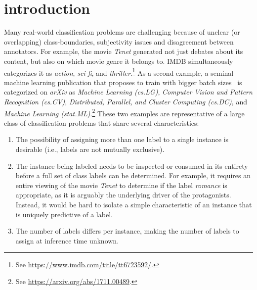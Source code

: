 
\section{introduction}
\label{sec:org662677c}


Many real-world classification problems are challenging because of unclear (or overlapping) class-boundaries, subjectivity issues and disagreement between annotators.
For example, the movie \textit{Tenet} generated not just debates about its content, but also on which movie genre it belongs to. IMDB simultaneously categorizes it as \textit{action}, \textit{sci-fi}, and \textit{thriller}.\footnote{See \url{https://www.imdb.com/title/tt6723592/}.}
As a second example, a seminal machine learning publication that proposes to train with bigger batch sizes~\citep{bigBSArxiv} is categorized on \textit{arXiv} as \textit{Machine Learning (cs.LG)},
\textit{Computer Vision and Pattern Recognition (cs.CV)}, \textit{Distributed,
Parallel, and Cluster Computing (cs.DC)}, and \textit{Machine Learning
(stat.ML)}.\footnote{See \url{https://arxiv.org/abs/1711.00489}.}
These two examples are representative of a large class of classification problems that share several characteristics:
\begin{enumerate}[label=(\arabic*),leftmargin=*]
\item The possibility of assigning more than one label to a single instance is desirable (i.e., labels are not mutually exclusive).
\item The instance being labeled needs to be inspected or consumed in its entirety before a full set of class labels can be determined. For example, it requires an entire viewing of the movie \textit{Tenet} to determine if the label \textit{romance} is appropriate, as it is arguably the underlying driver of the protagonists. Instead, it would be hard to isolate a simple characteristic of an instance that is uniquely predictive of a label.
\item The number of labels differs per instance, making the number of labels to assign at inference time unknown.
\end{enumerate}

